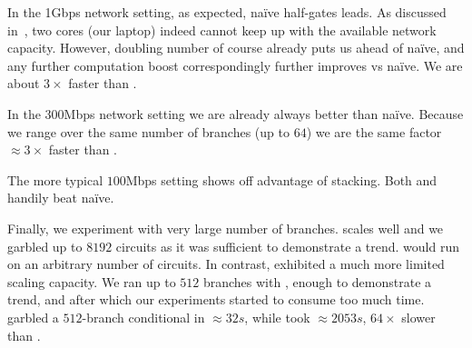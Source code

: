 In the 1Gbps network setting, as expected, na\"ive half-gates leads.  As discussed in~, two cores (our laptop) indeed cannot keep up with the available network capacity.  However, doubling number of course already puts us ahead of na\"ive, and any further computation boost correspondingly further improves \ourschemelong vs na\"ive.  We are about $3\times$ faster than \stack.

In the 300Mbps network setting we are already always better than na\"ive.  Because we range over the same number of branches (up to $64$) we are the same factor $\approx 3\times$ faster than \stack.

The more typical $100$Mbps setting shows off advantage of stacking.  Both \stack and \ourschemelong handily beat na\"ive.

Finally, we experiment with very large number of branches.  \ourschemelong scales well and we garbled up to $8192$ circuits as it was sufficient to demonstrate a trend.  \ourschemelong would run on an arbitrary number of circuits.  In contrast, \stack exhibited a much more limited scaling capacity.  We ran up to $512$ branches with \stack, enough to demonstrate a trend, and after which our experiments started to consume too much time.   \ourschemelong garbled a $512$-branch conditional in $\approx 32s$, while \stack took $\approx 2053s$,  $64\times$ slower than \ourschemelong.


